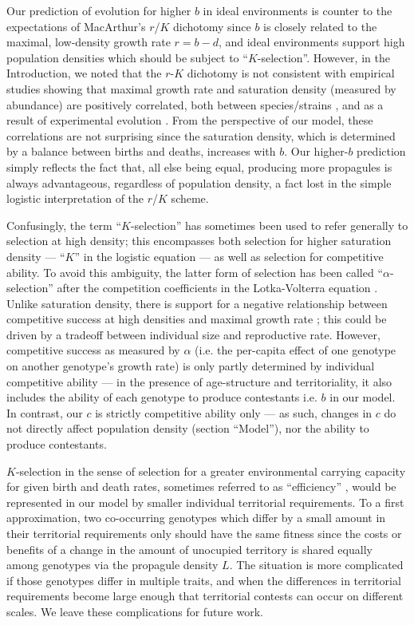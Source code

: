 \documentclass[11pt]{article}
\begin{document}
Our prediction of evolution for higher $b$ in ideal environments is counter to the expectations of MacArthur's $r$/$K$ dichotomy \citep{macarthur_1967} since $b$ is closely related to the maximal, low-density growth rate $r=b-d$, and ideal environments support high population densities which should be subject to ``$K$-selection''. However, in the Introduction, we noted that the $r$-$K$ dichotomy is not consistent with empirical studies showing that maximal growth rate and saturation density (measured by abundance) are positively correlated, both between species/strains \citep{luckinbill_1979,kuno_1991,hendriks_2005,fitzsimmons_2010}, and as a result of experimental evolution \citep{luckinbill_1978,luckinbill_1979}. From the perspective of our model, these correlations are not surprising since the saturation density, which is determined by a balance between births and deaths, increases with $b$. Our higher-$b$ prediction simply reflects the fact that, all else being equal, producing more propagules is always advantageous, regardless of population density, a fact lost in the simple logistic interpretation of the $r$/$K$ scheme. 

Confusingly, the term ``$K$-selection'' has sometimes been used to refer generally to selection at high density; this encompasses both selection for higher saturation density --- ``$K$'' in the logistic equation --- as well as selection for competitive ability. To avoid this ambiguity, the latter form of selection has been called ``$\alpha$-selection'' after the competition coefficients in the Lotka-Volterra equation \citep{gill_1974,case_1974,joshi_2001}. Unlike saturation density, there is support for a negative relationship between competitive success at high densities and maximal growth rate \citep{luckinbill_1979}; this could be driven by a tradeoff between individual size and reproductive rate. However, competitive success as measured by $\alpha$ (i.e. the per-capita effect of one genotype on another genotype's growth rate) is only partly determined by individual competitive ability --- in the presence of age-structure and territoriality, it also includes the ability of each genotype to produce contestants i.e. $b$ in our model. In contrast, our $c$ is strictly competitive ability only --- as such, changes in $c$ do not directly affect population density (section ``Model''), nor the ability to produce contestants.

$K$-selection in the sense of selection for a greater environmental carrying capacity for given birth and death rates, sometimes referred to as ``efficiency'' \citep{macarthur_1967}, would be represented in our model by smaller individual territorial requirements. To a first approximation, two co-occurring genotypes which differ by a small amount in their territorial requirements only should have the same fitness since the costs or benefits of a change in the amount of unocupied territory is shared equally among genotypes via the propagule density $L$. The situation is more complicated if those genotypes differ in multiple traits, and when the differences in territorial requirements become large enough that territorial contests can occur on different scales. We leave these complications for future work. 
\end{document}
